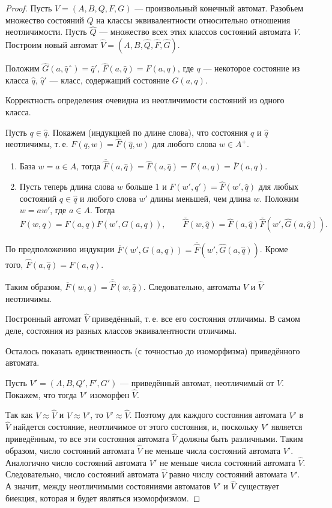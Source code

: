 \begin{proof}
    Пусть $V=(A, B, Q, F, G)$ --- произвольный конечный автомат. Разобьем множество состояний $Q$ на классы эквивалентности относительно отношения неотличимости.
Пусть $\hat{Q}$ --- множество всех этих классов состояний автомата $V$. Построим новый автомат $\hat{V} = (A, B, \hat{Q}, \hat{F}, \hat{G})$.

Положим $\hat{G}(a, \hat{q}ˆ) = \hat{q}'$, $\hat{F}(a, \hat{q}) = F(a, q)$, где $q$ --- некоторое состояние из класса $\hat{q}$, $\hat{q}'$ --- класс, содержащий состояние $G(a, q)$.

Корректность определения очевидна из неотличимости состояний из одного класса.

Пусть $q \in \hat{q}$. Покажем (индукцией по длине слова), что состояния $q$ и $\hat{q}$ неотличимы, т.\,е. $F(q,w) = \hat{F}(\hat{q}, w)$ для любого слова $w \in A^+$.

\begin{enumerate}[nolistsep]
    \item База $w=a \in A$, тогда $\overline{\hat{F}}(a, \hat{q}) = \hat{F}(a, \hat{q}) = F(a, q) = \overline{F}(a, q)$.
    \item Пусть теперь длина слова $w$ больше 1 и $F(w', q') = \hat{F}(w', \hat{q})$ для любых состояний $q \in \hat{q}$ и любого слова $w'$ длины меньшей,
чем длина $w$. Положим $w = aw'$, где $a \in A$. Тогда
\[
    \overline{F}(w, q) = F(a, q) \overline{F}(w', G(a, q)), \qquad \overline{\hat{F}}(w, \hat{q}) = \hat{F}(a, \hat{q}) \overline{\hat{F}}(w', \hat{G} (a, \hat{q})).
\]
\end{enumerate}

По предположению индукции $\overline{F}(w', G(a,q)) = \overline{\hat{F}}(w', \hat{G}(a,\hat{q}))$. Кроме того, $\hat{F}(a, \hat{q}) = F(a, q)$.

Таким образом, $\overline{F}(w, q) = \overline{\hat{F}}(w, \hat{q})$. Следовательно, автоматы $V$ и $\hat{V}$ неотличимы.

Постронный автомат $\hat{V}$ приведённый, т.\,е. все его состояния отличимы. В самом деле, состояния из разных классов эквивалентности отличимы.

Осталось показать единственность (с точностью до изоморфизма) приведённого автомата. 

Пусть $V' = (A, B, Q', F', G')$ --- приведённый автомат,
неотличимый от $V$. Покажем, что тогда $V'$ изоморфен $\hat{V}$.

Так как $V \approx \hat{V}$ и $V \approx V'$, то $V' \approx \hat{V}$. Поэтому для каждого состояния автомата $V'$ в $\hat{V}$ найдется состояние, неотличимое от этого состояния, и, поскольку $V'$ является приведённым, то все эти состояния автомата $\hat{V}$ должны быть различными. Таким образом, число состояний автомата $\hat{V}$ не меньше числа состояний автомата $V'$. Аналогично число состояний автомата $V'$ не меньше числа состояний автомата $\hat{V}$. Следовательно, число состояний автомата $\hat{V}$ равно числу состояний автомата $V'$. А значит, между неотличимыми состояниями автоматов $V'$ и $\hat{V}$ существует биекция, которая и будет являться изоморфизмом.
\end{proof}